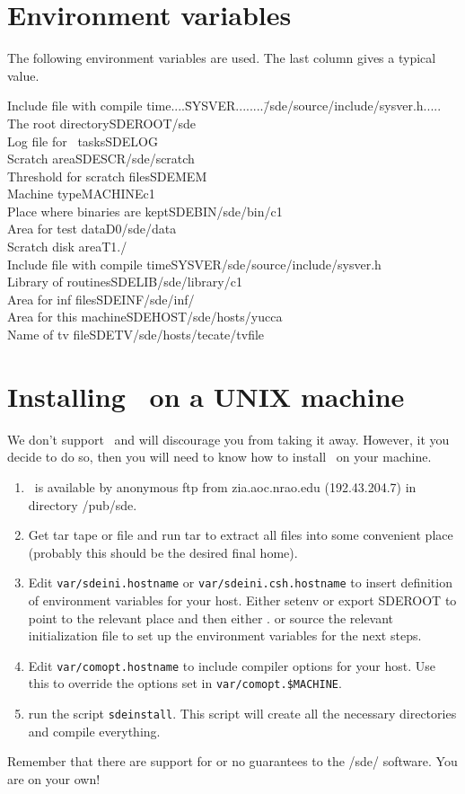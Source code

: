 \section{Environment variables}

The following environment variables are used. The last column gives a
typical value.

\begin{tabbing}
Include file with compile time....\=SYSVER........\=/sde/source/include/sysver.h.....\kill
The root directory\>SDEROOT\>/sde\\
Log file for \sde\ tasks\>SDELOG\> \\
Scratch area\>SDESCR\>/sde/scratch\\
Threshold for scratch files\>SDEMEM\\
Machine type\>MACHINE\>c1\\
Place where binaries are kept\>SDEBIN\>/sde/bin/c1\\
Area for test data\>D0\>/sde/data\\
Scratch disk area\>T1\>./\\
Include file with compile time\>SYSVER\>/sde/source/include/sysver.h\\
Library of routines\>SDELIB\>/sde/library/c1\\
Area for inf files\>SDEINF\>/sde/inf/\\
Area for this machine\>SDEHOST\>/sde/hosts/yucca\\
Name of tv file\>SDETV\>/sde/hosts/tecate/tvfile
\end{tabbing}

\newpage
\section{Installing \sde\ on a UNIX machine}

We don't support \sde\ and will discourage you from taking it away. However, it
you decide to do so, then you will need to know how to install \sde\ on your
machine. 

\begin{enumerate}
\item \sde\ is available by anonymous ftp from zia.aoc.nrao.edu
(192.43.204.7) in directory /pub/sde.
\item Get tar tape or file and run tar to extract all files into
some convenient place (probably this should be the desired final home).
\item Edit {\tt var/sdeini.hostname} or {\tt var/sdeini.csh.hostname} 
to insert definition of environment variables for your host. Either
setenv or export SDEROOT to point to the relevant place and then
either . or source the relevant initialization file to set up the
environment variables for the next steps.
\item Edit {\tt var/comopt.hostname} to include compiler options for your host.
Use this to override the options set in {\tt var/comopt.\$MACHINE}.
\item run the script {\tt sdeinstall}. This script will create all the 
necessary directories and compile everything.
\end{enumerate}
Remember that there are support for or no guarantees to the /sde/
software. You are on your own!

